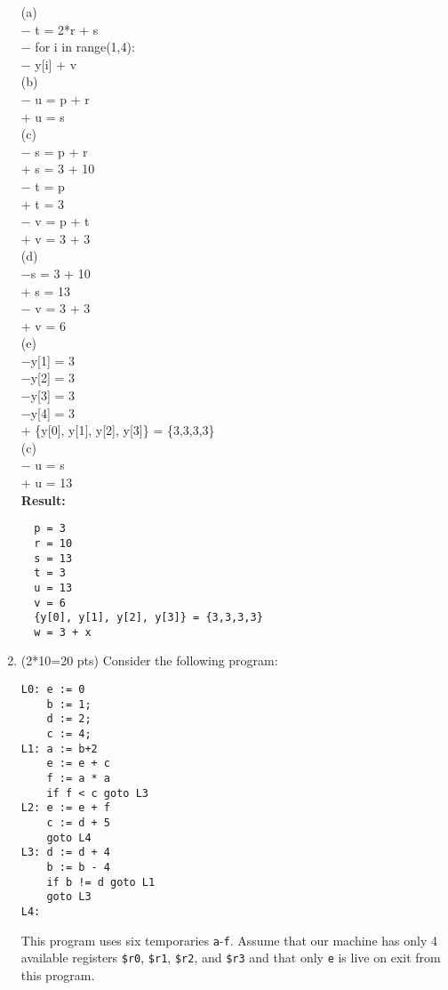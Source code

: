 \documentclass[10pt]{article}
\begin{document}
\begin{enumerate}
\newpage
(a)\\
$-$ t = 2*r + s\\
$-$ for i in range(1,4): \\
$-$ y[i] + v\\
(b)\\
$-$  u = p + r \\
$+$  u = s \\
(c) \\
$-$  s = p + r \\
$+$  s = 3 + 10 \\
$-$ t = p \\
$+$ t = 3\\
$-$  v = p + t \\
$+$  v = 3 + 3 \\
(d) \\
$- $s = 3 + 10  \\
$+$ s = 13\\
$-$ v = 3 + 3 \\
$+$ v = 6 \\
(e)\\
$-$y[1] = 3\\
$-$y[2] = 3\\
$-$y[3] = 3\\
$-$y[4] = 3\\
$+$
\{y[0], y[1], y[2], y[3]\} = \{3,3,3,3\} \\
(c) \\
$-$  u = s \\
$+$ u = 13 \\
\textbf{Result:} 
\begin{verbatim}
  p = 3
  r = 10
  s = 13 
  t = 3
  u = 13
  v = 6
  {y[0], y[1], y[2], y[3]} = {3,3,3,3}
  w = 3 + x
\end{verbatim}



\item (2*10=20 pts) Consider the following program:

\begin{verbatim}
L0: e := 0
    b := 1;
    d := 2;
    c := 4;
L1: a := b+2
    e := e + c
    f := a * a
    if f < c goto L3
L2: e := e + f
    c := d + 5
    goto L4
L3: d := d + 4
    b := b - 4
    if b != d goto L1
    goto L3
L4:
\end{verbatim}

This program uses six temporaries \texttt{a}-\texttt{f}.  Assume that
our machine has only 4 available registers \texttt{\$r0},
\texttt{\$r1}, \texttt{\$r2}, and \texttt{\$r3}
and that only
\texttt{e} is live on exit from this program.


\end{enumerate}
\end{document}
